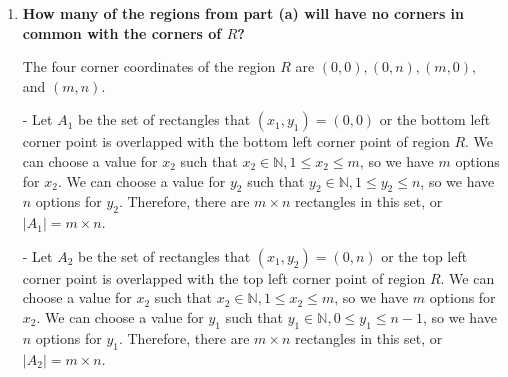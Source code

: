 \documentclass[10pt]{article}
\begin{document}
\begin{enumerate}
\begin{enumerate}
To count the number of rectangles with sides parallel to the sides of $R$, we first find the number of ways to assign a value to $x_1,x_2,y_1, y_2$. Let $(x_1,y_1)$ be the bottom left corner coordinate and $(x_2,y_2)$ be the top right corner coordinate. 

For $x_1$, it can go from 0 to $m-1$, increasing by 1, so there are $m$ ways to choose this value (since if $x_1 = m$, we cannot find a possible value for $x_2$). When we choose a value $0 \leq a \leq m - 1$ for $x_1$, the possible values for $x_2$ can only be from $a + 1$ to $m$. Therefore, the number of ways we can choose $x_1$ and $x_2$ accordingly:

$$\sum\limits_{x_1=0}^{m-1}(m-x_1)= m + (m-1) + (m-2) + \ldots + 2 + 1 = \frac{(m+1)m}{2}$$

For $y_1$, it can go from 0 to $n-1$, increasing by 1, so there are $n$ ways to choose this value (since if $y_1 = n$, we cannot find a possible value for $y_2$). When we choose a value $0 \leq b \leq n - 1$ for $y_1$, the possible values for $y_2$ can only be from $b + 1$ to $n$. Therefore, the number of ways we can choose $y_1$ and $y_2$ accordingly:

$$\sum\limits_{y_1=0}^{n-1}(n-y_1)= n + (n-1) + (n-2) + \ldots + 2 + 1 = \frac{(n+1)n}{2}$$

In conclusion, the total number of ways to choose $x_1, x_2, y_1, y_2$ or the number of rectangles, with sides parallel to the sides of $R$:

$$\frac{(m+1)m}{2} \times \frac{(n+1)n}{2} = \frac{(n^2+n)(m^2+m)}{4}$$

\item
\textbf{How many of the regions from part (a) will have no corners in common with the corners of $R$?}

The four corner coordinates of the region $R$ are $(0,0), (0,n), (m,0),$ and $(m,n)$.

- Let $A_1$ be the set of rectangles that $(x_1,y_1)=(0,0)$ or the bottom left corner point is overlapped with the bottom left corner point of region $R$. We can choose a value for $x_2$ such that $x_2 \in \mathbb{N}, 1 \leq x_2 \leq m$, so we have $m$ options for $x_2$. We can choose a value for $y_2$ such that $y_2 \in \mathbb{N}, 1 \leq y_2 \leq n$, so we have $n$ options for $y_2$. Therefore, there are $m \times n $ rectangles in this set, or $|A_1|=m\times n$.


- Let $A_2$ be the set of rectangles that $(x_1,y_2)=(0,n)$ or the top left corner point is overlapped with the top left corner point of region $R$. We can choose a value for $x_2$ such that $x_2 \in \mathbb{N}, 1 \leq x_2 \leq m$, so we have $m$ options for $x_2$. We can choose a value for $y_1$ such that $y_1 \in \mathbb{N}, 0 \leq y_1 \leq n - 1$, so we have $n$ options for $y_1$. Therefore, there are $m \times n$ rectangles in this set, or $|A_2|=m\times n$.



\end{enumerate}
\end{enumerate}
\end{document}
